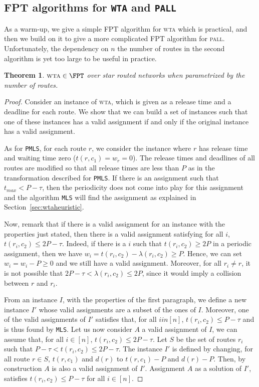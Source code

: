 \documentclass[a4paper,10pt]{journal}
\newcommand\MLS{\texttt{MLS}\xspace}
\newcommand\PMLS{\texttt{PMLS}\xspace}
\newtheorem{theorem}{Theorem}
\newcommand\pall{\textsc{pall}\xspace}
\newcommand\wta{\textsc{wta}\xspace}
\begin{document}
\subsection{FPT algorithms for \texttt{WTA} and \texttt{PALL}}

As a warm-up, we give a simple FPT algorithm for \wta which is practical,
and then we build on it to give a more complicated FPT algorithm for \pall. Unfortunately, the dependency on $n$ the number of routes in the second algorithm is yet too large to be useful in practice. 

\begin{theorem}\label{th:braFPT}
$\wta \in \FPT$ over star routed networks when parametrized by the number of routes.
\end{theorem}
\begin{proof}
 Consider an instance of \wta, which is given as a release time and a deadline for each route.
 We show that we can build a set of instances such that one of these instances has a valid assignment if and only if the original instance has a valid assignment.

  As for \PMLS, for each route $r$, we consider the instance where $r$ has release time and waiting time zero ($t(r,c_1) = w_r = 0$). The release times and deadlines of all routes are modified so that all release times are less than $P$ as in the transformation described for \PMLS. If there is an assignment such that $t_{max} < P-\tau$, then the periodicity does not come into play for this assignment and the algorithm \MLS will find the assignment as explained in Section~\ref{sec:wtaheuristic}.

 Now, remark that if there is a valid assignment for an instance with the properties just stated,
 then there is a valid assignment satisfying for all $i$, $t(r_i,c_2) \leq 2P - \tau$.  
 Indeed, if there is a $i$ such that $t(r_i,c_2) \geq 2P$ in a periodic assignment, then we have 
 $w_i = t(r_i,c_2) - \lambda(r_i,c_2) \geq P$. Hence, we can set $w_i = w_i -P \geq 0$ and we still have 
 a valid assignment. Moreover, for all $r_i \neq r$, it is not possible that $2P-\tau < \lambda(r_i,c_2) \leq 2P$, since it would imply a collision between $r$ and $r_i$.
 

From an instance $I$, with the properties of the first paragraph, we define a new instance $I'$ whose valid assignments are a subset of the ones of $I$. Moreover, one of the valid assignments of $I'$ satisfies that, for all $i in [n]$, $t(r_i,c_2) \leq P - \tau$ and is thus found by \MLS. 
Let us now consider $A$ a valid assignment of $I$, we can assume that, for all $i \in [n]$, $t(r_i,c_2) \leq 2P - \tau$. Let $S$ be the set of routes $r_i$ such that  $P - \tau < t(r_i,c_2) \leq 2P - \tau$. The instance $I'$ is defined by changing, for all route $r \in S$, $t(r,c_1)$ and $d(r)$ to $t(r,c_1) - P$ and $d(r) - P$. Then, by construction $A$ is also a valid assignment of $I'$. Assignment $A$ as a solution of $I'$, satisfies $t(r_i,c_2) \leq P - \tau$ for all $i\in [n]$. 


\end{proof}
\end{document}

